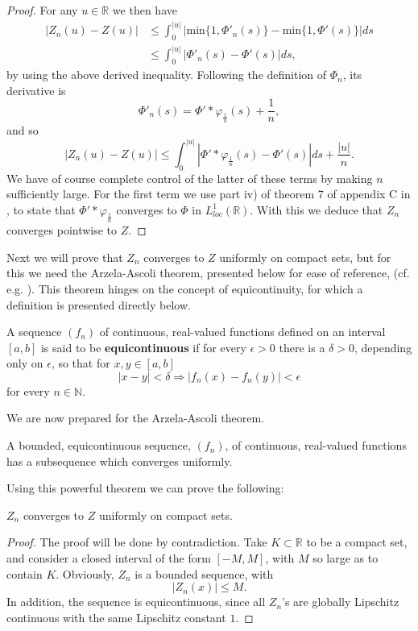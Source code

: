 \documentclass[11pt, a4paper]{article}
\begin{document}
\begin{appendix}
\begin{proof}
For any $u \in \mathbb{R}$ we then have
\begin{align*}
|Z_n(u) - Z(u)| &\leq \int_0^{|u|} |\mathrm{min}\{1,\Phi'_n(s)\} - \mathrm{min}\{1,\Phi'(s)\}|ds \\
&\leq \int_0^{|u|} |\Phi'_n(s)-\Phi'(s)|ds,
\end{align*}
by using the above derived inequality. Following the definition of $\Phi_n$, its derivative is
\begin{equation*}
\Phi'_n(s) = \Phi' * \varphi_{\frac{1}{n}}(s) + \frac{1}{n},
\end{equation*}
and so
\begin{equation*}
|Z_n(u) - Z(u)| \leq \int_0^{|u|}|\Phi'*\varphi_{\frac{1}{n}}(s) - \Phi'(s)|ds + \frac{|u|}{n}.
\end{equation*}
We have of course complete control of the latter of these terms by making $n$ sufficiently large. For the first term we use part iv) of theorem 7 of appendix C in \citep{evans}, to state that $\Phi'*\varphi_{\frac{1}{n}}$ converges to $\Phi$ in $L^1_{loc}(\mathbb{R})$. With this we deduce that $Z_n$ converges pointwise to $Z$.
\end{proof}

Next we will prove that $Z_n$ converges to $Z$ uniformly on compact sets, but for this we need the Arzela-Ascoli theorem, presented below for ease of reference, (cf. e.g. \citep[p 718]{evans}). This theorem hinges on the concept of equicontinuity, for which a definition is presented directly below.
\begin{mydef}
A sequence $(f_n)$ of continuous, real-valued functions defined on an interval $[a,b]$ is said to be \textbf{equicontinuous} if for every $\epsilon >0$ there is a $\delta >0 $, depending only on $\epsilon$, so that for $x,y \in [a,b]$
\begin{equation*}
|x-y| < \delta \Rightarrow |f_n(x) - f_n(y)| < \epsilon
\end{equation*}
for every $n \in \mathbb{N}$.
\end{mydef}
We are now prepared for the Arzela-Ascoli theorem.
\begin{theorem}
\label{thm:Ascoli}
A bounded, equicontinuous sequence, $(f_n)$, of continuous, real-valued functions has a subsequence which converges uniformly.
\end{theorem}

Using this powerful theorem we can prove the following:
\begin{proposition}
\label{prop:Z_uniform_convergence}
$Z_n$ converges to $Z$ uniformly on compact sets.
\end{proposition}
\begin{proof}
The proof will be done by contradiction. Take $K \subset \mathbb{R}$ to be a compact set, and consider a closed interval of the form $[-M,M]$, with $M$ so large as to contain $K$. Obviously, $Z_n$ is a bounded sequence, with
\begin{equation*}
|Z_n(x)| \leq M.
\end{equation*}
In addition, the sequence is equicontinuous, since all $Z_n$'s are globally Lipschitz continuous with the same Lipschitz constant $1$.


\end{proof}
\end{appendix}
\end{document}
